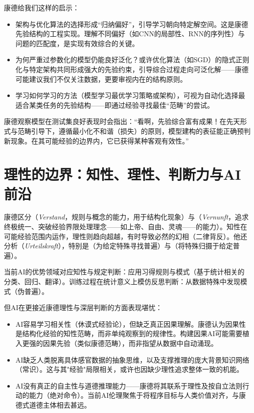 康德给我们这样的启示：
\begin{itemize}
\item{} 架构与优化算法的选择形成“归纳偏好”，引导学习朝向特定解空间。这是康德先验结构的工程实现。理解不同偏好（如CNN的局部性、RNN的序列性）与问题的匹配度，是实现有效综合的关键。
\item{} 为何严重过参数化的模型仍能良好泛化？或许优化算法（如SGD）的隐式正则化与特定架构共同形成强大的先验约束，引导综合过程走向可泛化解——康德可能建议我们不仅关注数据，更要审视内在的结构原则。
\item{} 学习如何学习的方法（模型学习最优学习策略或架构），可视为自动化选择最适合某类任务的先验结构——即通过经验寻找最佳“范畴”的尝试。
\end{itemize}

康德观察模型在测试集良好表现时会指出：“看啊，先验综合富有成果！在先天形式与范畴引导下，遵循最小化不和谐（损失）的原则，模型建构的表征能正确预判新现象。在其可能经验的边界内，它已获得某种客观有效性。”

\section{理性的边界：知性、理性、判断力与AI前沿}

康德区分（\textit{Verstand}，规则与概念的能力，用于结构化现象）与（\textit{Vernunft}，追求终极统一、突破经验界限处理理念——如上帝、自由、灵魂——的能力）。知性在可能经验范围内运作，理性则趋向超越，有时导致必然的幻相（二律背反）。他还分析（\textit{Urteilskraft}），特别是（为给定特殊寻找普遍）与（将特殊归摄于给定普遍）。

当前AI的优势领域对应知性与规定判断：应用习得规则与模式（基于统计相关的分类、回归、翻译）。训练过程在统计意义上模仿反思判断：从数据特殊中发现模式（伪普遍）。

但AI在更接近康德理性与深层判断的方面表现堪忧：
\begin{itemize}
\item{} AI容易学习相关性（休谟式经验论），但缺乏真正因果理解。康德认为因果性是结构化经验的知性范畴，而非单纯观察到的规律性。构建因果AI可能需要植入更强的因果先验（类似康德范畴），而非指望从数据中自动涌现。
\item{} AI缺乏人类脱离具体感官数据的抽象思维，以及支撑推理的庞大背景知识网络（常识）。这与其"经验"局限相关，或许也因缺少理性追求整体一致的机能。
\item{} AI没有真正的自主性与道德推理能力——康德将其联系于理性及按自立法则行动的能力（绝对命令）。当前AI伦理聚焦于将程序目标与人类价值对齐，与康德式道德主体相去甚远。
\end{itemize}

